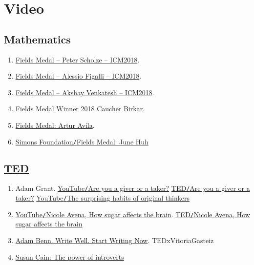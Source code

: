 \documentclass{article}
\begin{document}
\section{Video}

\subsection{Mathematics}

\begin{enumerate}
	\item \href{https://www.youtube.com/watch?v=yEVlCZTqht8}{Fields Medal -- Peter Scholze -- ICM2018}.
	\item \href{https://www.youtube.com/watch?v=G0rrnx8SaDI}{Fields Medal -- Alessio Figalli -- ICM2018}.
	\item \href{https://www.youtube.com/watch?v=p7iXVQxvM00}{Fields Medal -- Akshay Venkatesh -- ICM2018}.
	\item \href{https://www.youtube.com/watch?v=mKLkzQqxmFE}{Fields Medal Winner 2018 Caucher Birkar}.
	\item \href{https://www.youtube.com/watch?v=yalkCpigHTA}{Fields Medal: Artur Avila}.
	\item \href{https://www.youtube.com/watch?v=yO8lQWb6TZ4}{Simons Foundation{\tt/}Fields Medal: June Huh}
\end{enumerate}

\subsection{\href{https://www.ted.com/}{TED}}

\begin{enumerate}
	\item {\sc Adam Grant.} \href{https://www.youtube.com/watch?v=YyXRYgjQXX0}{YouTube{\tt/}Are you a giver or a taker?} \href{https://www.ted.com/talks/adam_grant_are_you_a_giver_or_a_taker}{TED{\tt/}Are you a giver or a taker?} \href{https://www.youtube.com/watch?v=fxbCHn6gE3U}{YouTube{\tt/}The surprising habits of original thinkers}
	\item \href{https://www.youtube.com/watch?v=lEXBxijQREo}{YouTube{\tt/}Nicole Avena, How sugar affects the brain}. \href{https://ed.ted.com/lessons/how-sugar-affects-the-brain-nicole-avena}{TED{\tt/}Nicole Avena, How sugar affects the brain}
	\item \href{https://www.youtube.com/watch?v=KUKgJsvoDUk}{Adam Benn. Write Well. Start Writing Now}. TEDxVitoriaGasteiz
	\item \href{https://www.youtube.com/watch?v=c0KYU2j0TM4}{Susan Cain: The power of introverts}
\end{enumerate}
\end{document}
